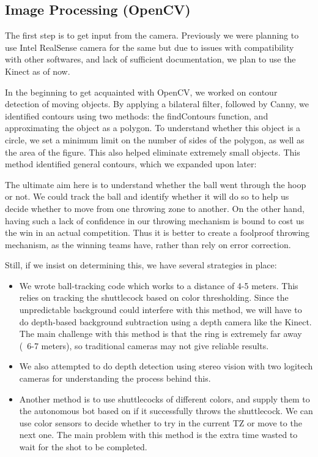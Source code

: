 \documentclass[11pt]{article}
\begin{document}
\subsection{Image Processing (OpenCV)}
The first step is to get input from the camera. Previously we were planning to use Intel RealSense camera for the same but due to issues with compatibility with other softwares, and lack of sufficient documentation, we plan to use the Kinect as of now.

In the beginning to get acquainted with OpenCV, we worked on contour detection of moving objects. By applying a bilateral filter, followed by Canny, we identified contours using two methods: the findContours function, and approximating the object as a polygon. To understand whether this object is a circle, we set a minimum limit on the number of sides of the polygon, as well as the area of the figure. This also helped eliminate extremely small objects. This method identified general contours, which we expanded upon later:

The ultimate aim here is to understand whether the ball went through the hoop or not. We could track the ball and identify whether it will do so to help us decide whether to move from one throwing zone to another. On the other hand, having such a lack of confidence in our throwing mechanism is bound to cost us the win in an actual competition. Thus it is better to create a foolproof throwing mechanism, as the winning teams have, rather than rely on error correction.

Still, if we insist on determining this, we have several strategies in place:

\begin{itemize}
\item{We wrote ball-tracking code which works to a distance of 4-5 meters. This relies on tracking the shuttlecock based on color thresholding. Since the unpredictable background could interfere with this method, we will have to do depth-based background subtraction using a depth camera like the Kinect. The main challenge with this method is that the ring is extremely far away (~6-7 meters), so traditional cameras may not give reliable results.}

\item{We also attempted to do depth detection using stereo vision with two logitech cameras for understanding the process behind this.}

\item{Another method is to use shuttlecocks of different colors, and supply them to the autonomous bot based on if it successfully throws the shuttlecock. We can use color sensors to decide whether to try in the current TZ or move to the next one. The main problem with this method is the extra time wasted to wait for the shot to be completed.}
\end{itemize}
\end{document}
